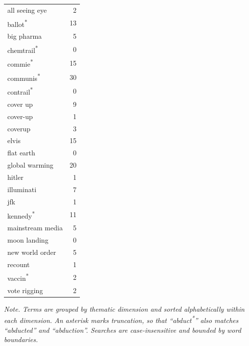 \documentclass[]{scrartcl}
\begin{document}
\begin{longtable}{@{}l@{\extracolsep{\fill}}r@{}}
   \addlinespace[.2em]
   all seeing eye                      &                     2   \\
   ballot\textsuperscript{*}           &                    13   \\
   big pharma                          &                     5   \\
   chemtrail\textsuperscript{*}        &                     0   \\
   commie\textsuperscript{*}           &                    15   \\
   communis\textsuperscript{*}         &                    30   \\
   contrail\textsuperscript{*}         &                     0   \\
   cover up                            &                     9   \\
   cover-up                            &                     1   \\
   coverup                             &                     3   \\
   elvis                               &                    15   \\
   flat earth                          &                     0   \\
   global warming                      &                    20   \\
   hitler                              &                     1   \\
   illuminati                          &                     7   \\
   jfk                                 &                     1   \\
   kennedy\textsuperscript{*}          &                    11   \\
   mainstream media                    &                     5   \\
   moon landing                        &                     0   \\
   new world order                     &                     5   \\
   recount                             &                     1   \\
   vaccin\textsuperscript{*}           &                     2   \\
   vote rigging                        &                     2   \\
\end{longtable}
\setlength{\LTleft}{\fill}\setlength{\LTright}{\fill}
\nopagebreak
\vspace{-.15\baselineskip}
\noindent\hfill\begin{minipage}{\keywordtabwidth}%
   \footnotesize
   \textit{Note.
   Terms are grouped by thematic dimension and sorted alphabetically within each dimension.
   An asterisk marks truncation, so that \enquote{abduct\textsuperscript{*}} also matches \enquote{abducted} and \enquote{abduction}.
   Searches are case-insensitive and bounded by word boundaries.}
\end{minipage}\hfill\null
\end{document}
